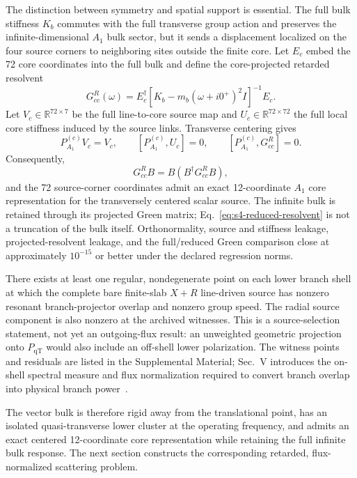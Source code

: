 \documentclass[10pt,aps,pre,reprint,floatfix,notitlepage,nofootinbib]{revtex4-2}
\newcommand{\PqT}{P_{\mathrm{qT}}}
\newcommand{\PAone}{P_{A_1}^{(c)}}
\begin{document}
The distinction between symmetry and spatial support is essential.  The full bulk stiffness $K_b$ commutes with the full transverse group action and preserves the infinite-dimensional $A_1$ bulk sector, but it sends a displacement localized on the four source corners to neighboring sites outside the finite core.  Let $E_c$ embed the 72 core coordinates into the full bulk and define the core-projected retarded resolvent
\begin{equation}
  G_{cc}^R(\omega)
  =E_c^\dagger
   \left[K_b-m_b(\omega+i0^+)^2 I\right]^{-1}
   E_c.
  \label{eq:s4-core-resolvent}
\end{equation}
Let $V_c\in\mathbb R^{72\times7}$ be the full line-to-core source map and $U_c\in\mathbb R^{72\times72}$ the full local core stiffness induced by the source links.  Transverse centering gives
\begin{equation}
  \PAone V_c=V_c,
  \qquad
  [\PAone,U_c]=0,
  \qquad
  [\PAone,G_{cc}^R]=0.
  \label{eq:s4-exact-reduction-identities}
\end{equation}
Consequently,
\begin{equation}
  G_{cc}^R B
  =B\left(B^\dagger G_{cc}^R B\right),
  \label{eq:s4-reduced-resolvent}
\end{equation}
and the 72 source-corner coordinates admit an exact 12-coordinate $A_1$ core representation for the transversely centered scalar source.  The infinite bulk is retained through its projected Green matrix; Eq.~\eqref{eq:s4-reduced-resolvent} is not a truncation of the bulk itself.  Orthonormality, source and stiffness leakage, projected-resolvent leakage, and the full/reduced Green comparison close at approximately $10^{-15}$ or better under the declared regression norms.

There exists at least one regular, nondegenerate point on each lower branch shell at which the complete bare finite-slab $X+R$ line-driven source has nonzero resonant branch-projector overlap and nonzero group speed. The radial source component is also nonzero at the archived witnesses. This is a source-selection statement, not yet an outgoing-flux result: an unweighted geometric projection onto $\PqT$ would also include an off-shell lower polarization. The witness points and residuals are listed in the Supplemental Material; Sec.~V introduces the on-shell spectral measure and flux normalization required to convert branch overlap into physical branch power~\cite{Sadasivam2017,Ong2018,Khodavirdi2024}.

The vector bulk is therefore rigid away from the translational point, has an isolated quasi-transverse lower cluster at the operating frequency, and admits an exact centered 12-coordinate core representation while retaining the full infinite bulk response.  The next section constructs the corresponding retarded, flux-normalized scattering problem.
\end{document}
